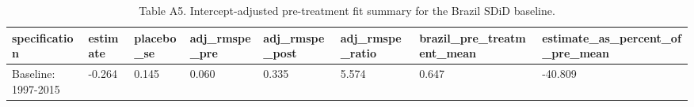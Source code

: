 \begin{table}

\caption{\label{tab:tab:sdid-prefit}Table A5. Intercept-adjusted pre-treatment fit summary for the Brazil SDiD baseline.}
\centering
\begin{tabular}[t]{llllllll}
\toprule
specification & estimate & placebo\_se & adj\_rmspe\_pre & adj\_rmspe\_post & adj\_rmspe\_ratio & brazil\_pre\_treatment\_mean & estimate\_as\_percent\_of\_pre\_mean\\
\midrule
Baseline: 1997-2015 & -0.264 & 0.145 & 0.060 & 0.335 & 5.574 & 0.647 & -40.809\\
\bottomrule
\end{tabular}
\end{table}
